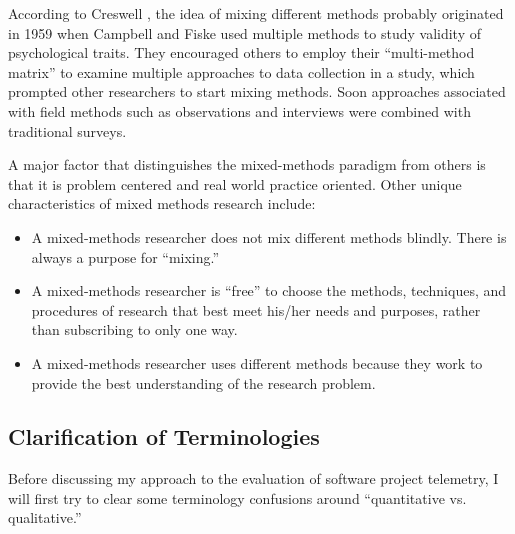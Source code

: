 According to Creswell \cite{Creswell:2003}, the idea of mixing different methods probably originated in 1959 when Campbell and Fiske used multiple methods to study validity of psychological traits. They encouraged others to employ their ``multi-method matrix'' to examine multiple approaches to data collection in a study, which prompted other researchers to start mixing methods. Soon approaches associated with field methods such as observations and interviews were combined with traditional surveys. 


A major factor that distinguishes the mixed-methods paradigm from others is that it is problem centered and real world practice oriented. Other unique characteristics of mixed methods research include:

\begin{itemize}
	
	\item A mixed-methods researcher does not mix different methods blindly. There is always a purpose for ``mixing.''
	
	\item A mixed-methods researcher is ``free'' to choose the methods, techniques, and procedures of research that best meet his/her needs and purposes, rather than subscribing to only one way.
	
	\item A mixed-methods researcher uses different methods because they work to provide the best understanding of the research problem. 
	
\end{itemize}








\subsection{Clarification of Terminologies}

Before discussing my approach to the evaluation of software project telemetry, I will first try to clear some terminology confusions around ``quantitative vs. qualitative.''

